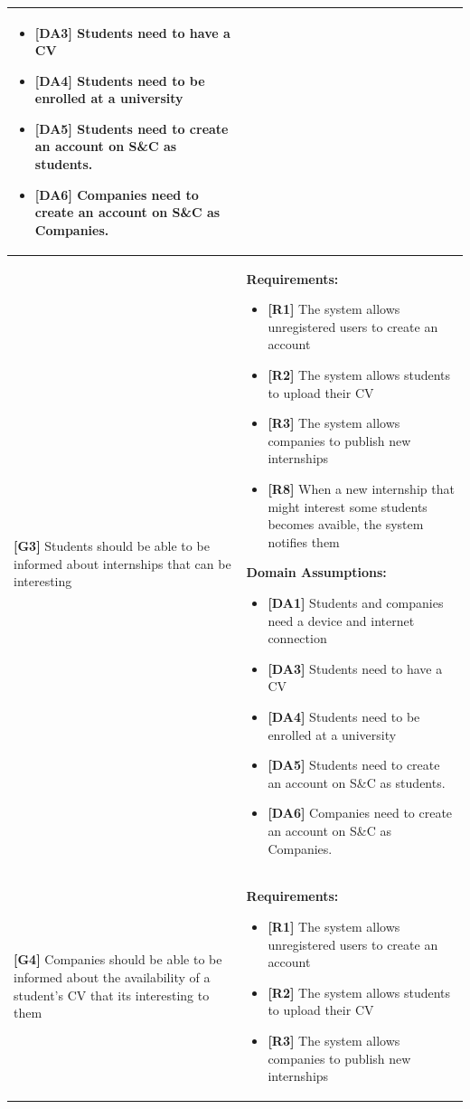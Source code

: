 \begin{longtable}{|p{}|p{}|}
\begin{itemize}
    \item \textbf{[DA3]} Students need to have a CV
     \item \textbf{[DA4]} Students need to be enrolled at a university
    \item \textbf{[DA5]} Students need to create an account on S\&C as students.
    \item \textbf{[DA6]} Companies need to create an account on S\&C as Companies.
\end{itemize} \\
\hline
\textbf{[G3]} Students should be able to be informed about internships that can be interesting 
& 
\textbf{Requirements:}
\begin{itemize}
    \item \textbf{[R1]} The system allows unregistered users to create an account
    \item \textbf{[R2]} The system allows students to upload their CV
    \item \textbf{[R3]} The system allows companies to publish new internships
    \item \textbf{[R8]} When a new internship that might interest some students becomes avaible, the system notifies them
\end{itemize}
\textbf{Domain Assumptions:}
\begin{itemize}
      \item \textbf{[DA1]} Students and companies need a device and internet connection
    \item \textbf{[DA3]} Students need to have a CV
     \item \textbf{[DA4]} Students need to be enrolled at a university
    \item \textbf{[DA5]} Students need to create an account on S\&C as students.
    \item \textbf{[DA6]} Companies need to create an account on S\&C as Companies.
\end{itemize} \\
\hline
\textbf{[G4]} Companies should be able to be informed about the availability of a student's CV that its interesting to them
& 
\textbf{Requirements:}
\begin{itemize}
    \item \textbf{[R1]} The system allows unregistered users to create an account
    \item \textbf{[R2]} The system allows students to upload their CV
    \item \textbf{[R3]} The system allows companies to publish new internships

\end{itemize}
\end{longtable}
